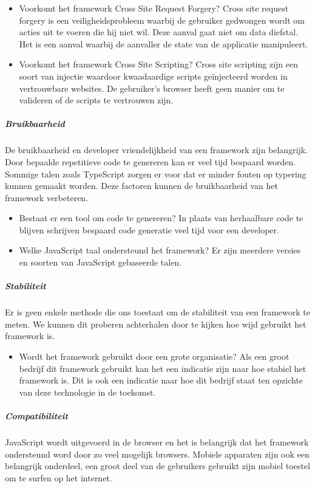 \begin{itemize}
	\item Voorkomt het framework Cross Site Request Forgery? Cross site request forgery is een veiligheidsprobleem waarbij de gebruiker gedwongen wordt om acties uit te voeren die hij niet wil. Deze aanval gaat niet om data diefstal. Het is een aanval waarbij de aanvaller de state van de applicatie manipuleert.
	\item Voorkomt het framework Cross Site Scripting? Cross site scripting zijn een soort van injectie waardoor kwaadaardige scripts geïnjecteerd worden in vertrouwbare websites. De gebruiker’s browser heeft geen manier om te valideren of de scripts te vertrouwen zijn.
\end{itemize}

\subparagraph{Bruikbaarheid}
De bruikbaarheid en developer vriendelijkheid van een framework zijn belangrijk. Door bepaalde repetitieve code te genereren kan er veel tijd bespaard worden. Sommige talen zoals TypeScript zorgen er voor dat er minder fouten op typering kunnen gemaakt worden. Deze factoren kunnen de bruikbaarheid van het framework verbeteren.

\begin{itemize}
	\item Bestaat er een tool om code te genereren? In plaats van herhaalbare code te blijven schrijven bespaard code generatie veel tijd voor een developer.
	\item Welke JavaScript taal ondersteund het framework? Er zijn meerdere versies en soorten van JavaScript gebaseerde talen.
\end{itemize}

\subparagraph{Stabiliteit}
Er is geen enkele methode die ons toestaat om de stabiliteit van een framework te meten. We kunnen dit proberen achterhalen door te kijken hoe wijd gebruikt het framework is.

\begin{itemize}
	\item Wordt het framework gebruikt door een grote organisatie? Als een groot bedrijf dit framework gebruikt kan het een indicatie zijn naar hoe stabiel het framework is. Dit is ook een indicatie naar hoe dit bedrijf staat ten opzichte van deze technologie in de toekomst.
\end{itemize}

\subparagraph{Compatibiliteit}
JavaScript wordt uitgevoerd in de browser en het is belangrijk dat het framework ondersteund word door zo veel mogelijk browsers. Mobiele apparaten zijn ook een belangrijk onderdeel, een groot deel van de gebruikers gebruikt zijn mobiel toestel om te surfen op het internet.

